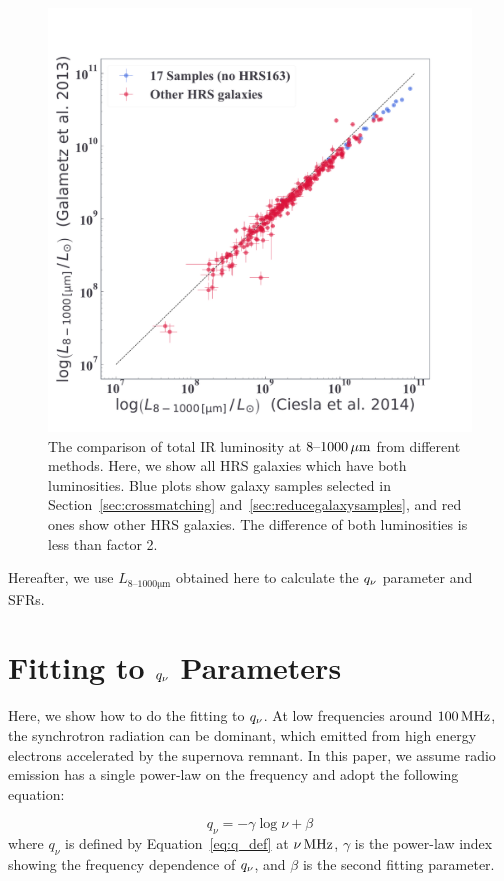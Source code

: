 \begin{figure}[htbp]
	\centering
	\includegraphics[width=.8\linewidth]{Chapter_4/Figures/Method_TIRcomparison.pdf}
    \caption[The comparison of total IR luminosities]{\label{fig:tircomparison}
        The comparison of total IR luminosity at $8\mbox{--}1000\,\mathrm{\mu m}$ from different methods.
        Here, we show all HRS galaxies which have both luminosities.
        Blue plots show galaxy samples selected in Section~\ref{sec:crossmatching} and~\ref{sec:reducegalaxysamples}, and red ones show other HRS galaxies.
        The difference of both luminosities is less than factor 2.
    }
\end{figure}

Hereafter, we use $L_{8\mbox{--}1000\mathrm{\mu m}}$ obtained here to calculate the $q_{\nu}$ parameter and SFRs.



\section{Fitting to $q_{\nu}$ Parameters}\label{sec:fittingtoq}
Here, we show how to do the fitting to $q_{\nu}$.
At low frequencies around $100\,\mathrm{MHz}$, the synchrotron radiation can be dominant, which emitted from high energy electrons accelerated by the supernova remnant.
In this paper, we assume radio emission has a single power-law on the frequency and adopt the following equation:

\begin{equation}\label{eq:q_fitting}
    q_{\nu} = -\gamma\log{\nu} + \beta
\end{equation}
where $q_{\nu}$ is defined by Equation~\ref{eq:q_def} at $\nu\,\mathrm{MHz}$, $\gamma$ is the power-law index showing the frequency dependence of $q_{\nu}$, and $\beta$ is the second fitting parameter.

